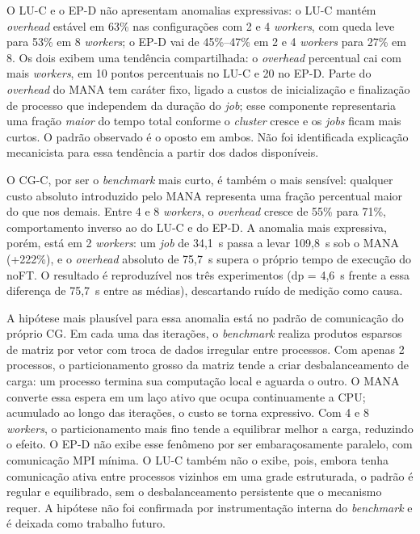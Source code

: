 O LU-C e o EP-D não apresentam
anomalias expressivas: o LU-C mantém \textit{overhead} estável em 63\% nas
configurações com 2 e 4 \textit{workers}, com queda leve para 53\% em 8
\textit{workers}; o EP-D vai de 45\%--47\% em 2 e 4 \textit{workers} para 27\%
em 8. Os dois exibem uma tendência compartilhada: o \textit{overhead} percentual
cai com mais \textit{workers}, em 10 pontos percentuais no LU-C e 20 no EP-D.
Parte do \textit{overhead} do MANA tem caráter fixo, ligado a custos de
inicialização e finalização de processo que independem da duração do \textit{job};
esse componente representaria uma fração \textit{maior} do tempo total conforme o
\textit{cluster} cresce e os \textit{jobs} ficam mais curtos. O padrão observado
é o oposto em ambos. Não foi identificada explicação mecanicista para essa
tendência a partir dos dados disponíveis.

O CG-C, por ser o \textit{benchmark} mais curto, é também o mais sensível:
qualquer custo absoluto introduzido pelo MANA representa uma fração percentual
maior do que nos demais. Entre 4 e 8 \textit{workers}, o \textit{overhead} cresce
de 55\% para 71\%, comportamento inverso ao do LU-C e do EP-D. A anomalia mais
expressiva, porém, está em 2 \textit{workers}: um \textit{job} de 34,1~s passa a
levar 109,8~s sob o MANA (+222\%), e o \textit{overhead} absoluto de 75,7~s supera
o próprio tempo de execução do noFT. O resultado é reproduzível nos três
experimentos (dp = 4,6~s frente a essa diferença de 75,7~s entre as médias),
descartando ruído de medição como causa.

A hipótese mais plausível para essa anomalia está no padrão de comunicação do
próprio CG. Em cada uma das iterações, o \textit{benchmark} realiza produtos
esparsos de matriz por vetor com troca de dados irregular entre processos. Com
apenas 2 processos, o particionamento grosso da matriz tende a criar desbalanceamento
de carga: um processo termina sua computação local e aguarda o outro. O MANA converte
essa espera em um laço ativo que ocupa continuamente a CPU; acumulado ao longo das
iterações, o custo se torna expressivo. Com 4 e 8 \textit{workers}, o particionamento
mais fino tende a equilibrar melhor a carga, reduzindo o efeito. O EP-D não exibe
esse fenômeno por ser embaraçosamente paralelo, com comunicação MPI mínima. O LU-C
também não o exibe, pois, embora tenha comunicação ativa entre processos vizinhos
em uma grade estruturada, o padrão é regular e equilibrado, sem o desbalanceamento
persistente que o mecanismo requer. A hipótese não foi confirmada por instrumentação
interna do \textit{benchmark} e é deixada como trabalho futuro.


